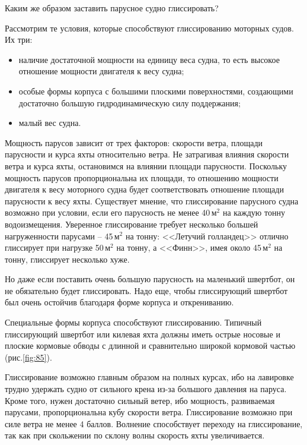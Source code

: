 \documentclass[a4paper, 12pt, twoside, final]{scrbook}
\begin{document}
Каким же образом заставить парусное судно глиссировать?

Рассмотрим те условия, которые способствуют глиссированию моторных судов. Их три:

\begin{itemize}
\item наличие достаточной мощности на единицу веса судна, то есть высокое отношение мощности двигателя к весу судна;
\item особые формы корпуса с большими плоскими поверхностями, создающими достаточно большую гидродинамическую силу поддержания;
\item малый вес судна.
\end{itemize}

Мощность парусов зависит от трех факторов: скорости ветра, площади парусности и курса яхты относительно ветра. Не затрагивая влияния скорости ветра и курса яхты, остановимся на влиянии площади парусности. Поскольку мощность парусов пропорциональна их площади, то отношению мощности двигателя к весу моторного судна будет соответствовать отношение площади парусности к весу яхты. Существует мнение, что глиссирование парусного судна возможно при условии, если его парусность не менее 40\,м$^2$ на каждую тонну водоизмещения. Уверенное глиссирование требует несколько большей нагруженности парусами \--- 45\,м$^2$ на тонну: <<Летучий голландец>> отлично глиссирует при нагрузке 50\,м$^2$ на тонну, а <<Финн>>, имея около 45\,м$^2$ на тонну, глиссирует несколько хуже. 

Но даже если поставить очень большую парусность на маленький швертбот, он не обязательно будет глиссировать. Надо еще, чтобы глиссирующий швертбот был очень остойчив благодаря форме корпуса и открениванию.

Специальные формы корпуса способствуют глиссированию. Типичный глиссирующий швертбот или килевая яхта должны иметь острые носовые и плоские кормовые обводы с длинной и сравнительно широкой кормовой частью (рис.\ref{fig:85}).{\sloppy\par}

Глиссирование возможно главным образом на полных курсах, ибо на лавировке трудно удержать судно от сильного крена из-за большого давления на паруса. Кроме того, нужен достаточно сильный ветер, ибо мощность, развиваемая парусами, пропорциональна кубу скорости ветра. Глиссирование возможно при силе ветра не менее 4 баллов. Волнение способствует переходу на глиссирование, так как при скольжении по склону волны скорость яхты увеличивается.
\end{document}
